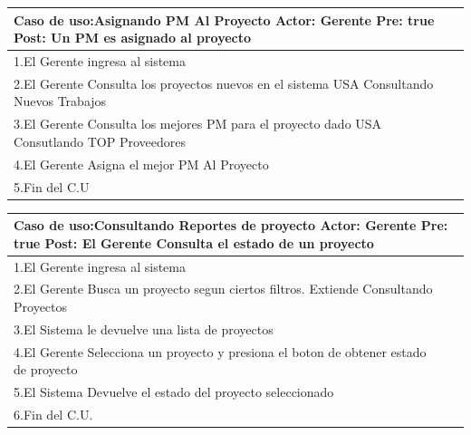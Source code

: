 \begin{longtable}{|p{}|p{}|}
    \hline
    \multicolumn{2}{|p{16cm}|}{
        \textbf{Caso de uso:}Asignando PM Al Proyecto\newline
        \textbf{Actor:} Gerente\newline
        \textbf{Pre: }true\newline
        \textbf{Post:} Un PM es asignado al proyecto
    }\\
    \hline
    1.El Gerente ingresa al sistema & \\
    \hline
    2.El Gerente Consulta los proyectos nuevos en el sistema USA Consultando Nuevos Trabajos&    \\
    \hline
    3.El Gerente Consulta los mejores PM para el proyecto dado USA Consutlando TOP Proveedores& \\
    \hline
    4.El Gerente Asigna el mejor PM Al Proyecto&\\
    \hline
    5.Fin del C.U&\\
    \hline
\end{longtable}


\begin{longtable}{|p{}|p{}|}
    \hline
    \multicolumn{2}{|p{16cm}|}{
        \textbf{Caso de uso:}Consultando Reportes de proyecto\newline
        \textbf{Actor:} Gerente\newline
        \textbf{Pre: }true\newline
        \textbf{Post:}  El Gerente Consulta el estado de un proyecto
    }\\
    \hline
    1.El Gerente ingresa al sistema & \\
    \hline
    2.El Gerente Busca un proyecto segun ciertos filtros. Extiende Consultando Proyectos&    \\
    \hline
    3.El Sistema le devuelve una lista de proyectos& \\
    \hline
    4.El Gerente Selecciona un proyecto y presiona el boton de obtener estado de proyecto&\\
    \hline
    5.El Sistema Devuelve el estado del proyecto seleccionado &\\
    \hline
    6.Fin del C.U.&\\
    \hline
\end{longtable}

